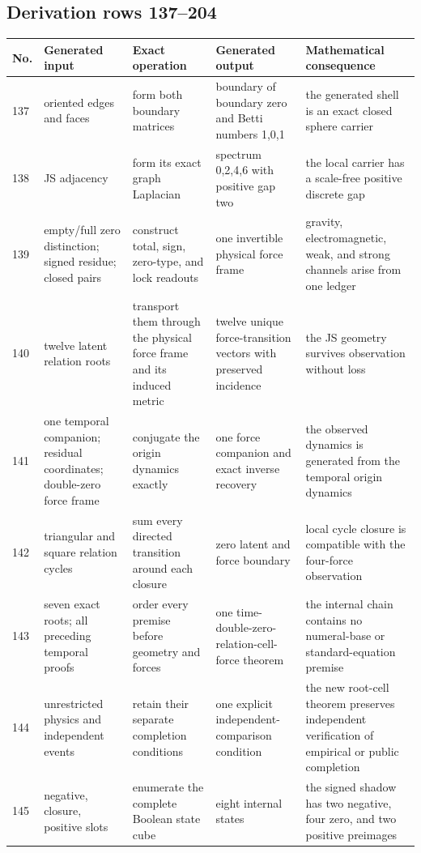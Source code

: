\documentclass[11pt]{article}
\numberwithin{equation}{section}
\theoremstyle{remark}
\begin{document}
\begin{landscape}
\subsection{Derivation rows 137--204}
\begin{longtable}{p{0.65cm}p{3.5cm}p{4.0cm}p{4.0cm}p{4.6cm}}
\toprule No.&Generated input&Exact operation&Generated output&Mathematical consequence\\\midrule\endhead
137&oriented edges and faces&form both boundary matrices&boundary of boundary zero and Betti numbers 1,0,1&the generated shell is an exact closed sphere carrier\\
138&JS adjacency&form its exact graph Laplacian&spectrum 0,2,4,6 with positive gap two&the local carrier has a scale-free positive discrete gap\\
139&empty/full zero distinction; signed residue; closed pairs&construct total, sign, zero-type, and lock readouts&one invertible physical force frame&gravity, electromagnetic, weak, and strong channels arise from one ledger\\
140&twelve latent relation roots&transport them through the physical force frame and its induced metric&twelve unique force-transition vectors with preserved incidence&the JS geometry survives observation without loss\\
141&one temporal companion; residual coordinates; double-zero force frame&conjugate the origin dynamics exactly&one force companion and exact inverse recovery&the observed dynamics is generated from the temporal origin dynamics\\
142&triangular and square relation cycles&sum every directed transition around each closure&zero latent and force boundary&local cycle closure is compatible with the four-force observation\\
143&seven exact roots; all preceding temporal proofs&order every premise before geometry and forces&one time-double-zero-relation-cell-force theorem&the internal chain contains no numeral-base or standard-equation premise\\
144&unrestricted physics and independent events&retain their separate completion conditions&one explicit independent-comparison condition&the new root-cell theorem preserves independent verification of empirical or public completion\\
145&negative, closure, positive slots&enumerate the complete Boolean state cube&eight internal states&the signed shadow has two negative, four zero, and two positive preimages\\

\end{longtable}
\end{landscape}
\end{document}
